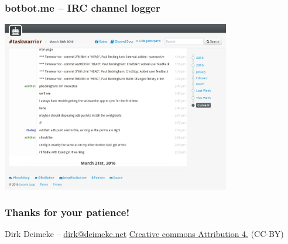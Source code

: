 \documentclass[t,handout]{beamer}
\begin{document}
\begin{frame}\frametitle{botbot.me -- IRC channel logger}
    \begin{center}
        \href{https://botbot.me/freenode/taskwarrior/}{\includegraphics[width=10cm,height=7.5cm]{botbot-me-taskwarrior.png}}
    \end{center}
\end{frame}


\begin{frame}\frametitle{Thanks for your patience!}
    \vfill
    Dirk Deimeke -- \href{mailto:dirk@deimeke.net}{dirk@deimeke.net}
    \vfill
    \href{https://creativecommons.org/licenses/by/4.0/}{Creative commons Attribution 4.} (CC-BY)
\end{frame}
\end{document}
